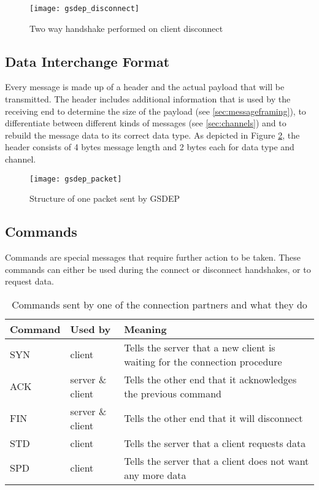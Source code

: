 \begin{figure}[H]
    \centering
    \texttt{[image: gsdep\_disconnect]}
    \caption{Two way handshake performed on client disconnect}
    \label{fig:disconnect}
\end{figure}

\subsection{Data Interchange Format}

Every message is made up of a header and the actual payload that will be transmitted. The header includes additional information that is used by the receiving end to determine the size of the payload (see \ref{sec:messageframing}), to differentiate between different kinds of messages (see \ref{sec:channels}) and to rebuild the message data to its correct data type. As depicted in Figure \ref{fig:packet}, the header consists of 4 bytes message length and 2 bytes each for data type and channel.

\begin{figure}[H]
    \centering
    \texttt{[image: gsdep\_packet]}
    \caption{Structure of one packet sent by GSDEP}
    \label{fig:packet}
\end{figure}

\subsection{Commands}
\label{sec:networking_command}

Commands are special messages that require further action to be taken. These commands can either be used during the connect or disconnect handshakes, or to request data.

\begin{table}[H]
    \centering
    \begin{tabular}{| l | l | p{5cm} |}
    \hline
    \textbf{Command} & \textbf{Used by} & \textbf{Meaning} \\ \hline
    SYN & client & Tells the server that a new client is waiting for the connection procedure \\ \hline
    ACK & server \& client & Tells the other end that it acknowledges the previous command \\ \hline
    FIN & server \& client & Tells the other end that it will disconnect \\ \hline
    STD & client & Tells the server that a client requests data\\ \hline
    SPD & client & Tells the server that a client does not want any more data\\
    \hline
    \end{tabular}
    \caption{Commands sent by one of the connection partners and what they do}
    \label{tab:commands}
\end{table}

